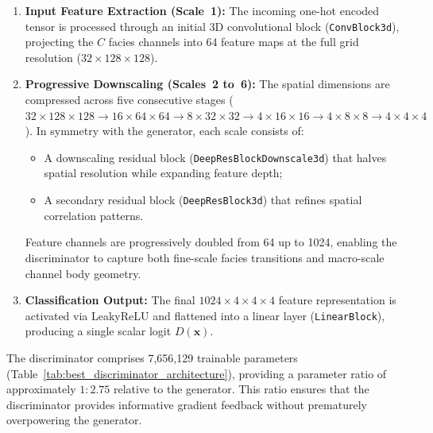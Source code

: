 \begin{enumerate}
    \item \textbf{Input Feature Extraction (Scale~1):} The incoming one-hot encoded tensor is processed through an initial 3D convolutional block (\texttt{ConvBlock3d}), projecting the $C$ facies channels into 64 feature maps at the full grid resolution ($32 \times 128 \times 128$).
    \item \textbf{Progressive Downscaling (Scales~2 to~6):} The spatial dimensions are compressed across five consecutive stages ($32 \times 128 \times 128 \to 16 \times 64 \times 64 \to 8 \times 32 \times 32 \to 4 \times 16 \times 16 \to 4 \times 8 \times 8 \to 4 \times 4 \times 4$). In symmetry with the generator, each scale consists of:
    \begin{itemize}
        \item A downscaling residual block (\texttt{DeepResBlockDownscale3d}) that halves spatial resolution while expanding feature depth;
        \item A secondary residual block (\texttt{DeepResBlock3d}) that refines spatial correlation patterns.
    \end{itemize}
    Feature channels are progressively doubled from 64 up to 1024, enabling the discriminator to capture both fine-scale facies transitions and macro-scale channel body geometry.
    \item \textbf{Classification Output:} The final $1024 \times 4 \times 4 \times 4$ feature representation is activated via LeakyReLU and flattened into a linear layer (\texttt{LinearBlock}), producing a single scalar logit $D(\mathbf{x})$.
\end{enumerate}

The discriminator comprises 7,656,129 trainable parameters (Table~\ref{tab:best_discriminator_architecture}), providing a parameter ratio of approximately $1:2.75$ relative to the generator. This ratio ensures that the discriminator provides informative gradient feedback without prematurely overpowering the generator.

